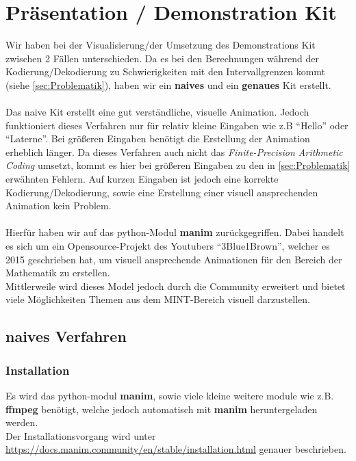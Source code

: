 \documentclass[a4paper]{article}
\theoremstyle{definition}
\theoremstyle{remark}
\begin{document}
			\section{Präsentation / Demonstration Kit}
Wir haben bei der Visualisierung/der Umsetzung des Demonstrations Kit zwischen 2 Fällen unterschieden. Da es bei den Berechnungen während der Kodierung/Dekodierung zu Schwierigkeiten mit den Intervallgrenzen kommt (siehe \ref{sec:Problematik}), haben wir ein \textbf{naives} und ein \textbf{genaues} Kit erstellt.
\\
\\
Das naive Kit erstellt eine gut verständliche, visuelle Animation. Jedoch funktioniert dieses Verfahren nur für relativ kleine Eingaben wie z.B ``Hello'' oder ``Laterne''. Bei größeren Eingaben benötigt die Erstellung der Animation erheblich länger. Da dieses Verfahren auch nicht das \textit{Finite-Precision Arithmetic Coding} umsetzt, kommt es hier bei größeren Eingaben zu den in \ref{sec:Problematik} erwähnten Fehlern. Auf kurzen Eingaben ist jedoch eine korrekte
Kodierung/Dekodierung, sowie eine Erstellung einer visuell ansprechenden Animation kein Problem. 
\\
\\
Hierfür haben wir auf das python-Modul \textbf{manim} zurückgegriffen. Dabei handelt es sich um ein Opensource-Projekt des Youtubers ``3Blue1Brown'', welcher es 2015 geschrieben hat, um visuell ansprechende Animationen für den Bereich der Mathematik zu erstellen.\cite{3blue1brown}
\\
Mittlerweile wird dieses Model jedoch durch die Community erweitert und bietet viele Möglichkeiten Themen aus dem MINT-Bereich visuell darzustellen.
\subsection{naives Verfahren}
\label{sec:manim}
\subsubsection{Installation}
Es wird das python-modul \textbf{manim}, sowie viele kleine weitere module wie z.B. \textbf{ffmpeg} benötigt, welche jedoch automatisch mit \textbf{manim} heruntergeladen werden.\\
Der Installationsvorgang wird unter \href{https://docs.manim.community/en/stable/installation.html}{https://docs.manim.community/en/stable/installation.html}
genauer beschrieben.
\\
\end{document}

